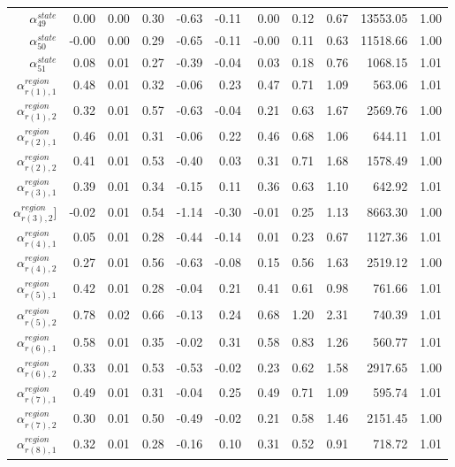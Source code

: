 \documentclass[12pt,english,a4paper]{article}
\begin{document}
\begin{table}[ht]
\begin{tabular}{rrrrrrrrrrr}
  $\alpha_{49}^{state}$ & 0.00 & 0.00 & 0.30 & -0.63 & -0.11 & 0.00 & 0.12 & 0.67 & 13553.05 & 1.00 \\ 
  $\alpha_{50}^{state}$ & -0.00 & 0.00 & 0.29 & -0.65 & -0.11 & -0.00 & 0.11 & 0.63 & 11518.66 & 1.00 \\ 
  $\alpha_{51}^{state}$ & 0.08 & 0.01 & 0.27 & -0.39 & -0.04 & 0.03 & 0.18 & 0.76 & 1068.15 & 1.01 \\ 
  $\alpha_{r(1),1}^{region}$ & 0.48 & 0.01 & 0.32 & -0.06 & 0.23 & 0.47 & 0.71 & 1.09 & 563.06 & 1.01 \\ 
  $\alpha_{r(1),2}^{region}$ & 0.32 & 0.01 & 0.57 & -0.63 & -0.04 & 0.21 & 0.63 & 1.67 & 2569.76 & 1.00 \\ 
  $\alpha_{r(2),1}^{region}$ & 0.46 & 0.01 & 0.31 & -0.06 & 0.22 & 0.46 & 0.68 & 1.06 & 644.11 & 1.01 \\ 
  $\alpha_{r(2),2}^{region}$ & 0.41 & 0.01 & 0.53 & -0.40 & 0.03 & 0.31 & 0.71 & 1.68 & 1578.49 & 1.00 \\ 
  $\alpha_{r(3),1}^{region}$ & 0.39 & 0.01 & 0.34 & -0.15 & 0.11 & 0.36 & 0.63 & 1.10 & 642.92 & 1.01 \\ 
  $\alpha_{r(3),2}^{region}$] & -0.02 & 0.01 & 0.54 & -1.14 & -0.30 & -0.01 & 0.25 & 1.13 & 8663.30 & 1.00 \\ 
  $\alpha_{r(4),1}^{region}$ & 0.05 & 0.01 & 0.28 & -0.44 & -0.14 & 0.01 & 0.23 & 0.67 & 1127.36 & 1.01 \\ 
  $\alpha_{r(4),2}^{region}$ & 0.27 & 0.01 & 0.56 & -0.63 & -0.08 & 0.15 & 0.56 & 1.63 & 2519.12 & 1.00 \\ 
  $\alpha_{r(5),1}^{region}$ & 0.42 & 0.01 & 0.28 & -0.04 & 0.21 & 0.41 & 0.61 & 0.98 & 761.66 & 1.01 \\ 
  $\alpha_{r(5),2}^{region}$ & 0.78 & 0.02 & 0.66 & -0.13 & 0.24 & 0.68 & 1.20 & 2.31 & 740.39 & 1.01 \\ 
  $\alpha_{r(6),1}^{region}$ & 0.58 & 0.01 & 0.35 & -0.02 & 0.31 & 0.58 & 0.83 & 1.26 & 560.77 & 1.01 \\ 
  $\alpha_{r(6),2}^{region}$ & 0.33 & 0.01 & 0.53 & -0.53 & -0.02 & 0.23 & 0.62 & 1.58 & 2917.65 & 1.00 \\ 
  $\alpha_{r(7),1}^{region}$ & 0.49 & 0.01 & 0.31 & -0.04 & 0.25 & 0.49 & 0.71 & 1.09 & 595.74 & 1.01 \\ 
  $\alpha_{r(7),2}^{region}$ & 0.30 & 0.01 & 0.50 & -0.49 & -0.02 & 0.21 & 0.58 & 1.46 & 2151.45 & 1.00 \\ 
  $\alpha_{r(8),1}^{region}$ & 0.32 & 0.01 & 0.28 & -0.16 & 0.10 & 0.31 & 0.52 & 0.91 & 718.72 & 1.01 \\ 

\end{tabular}
\end{table}
\end{document}

